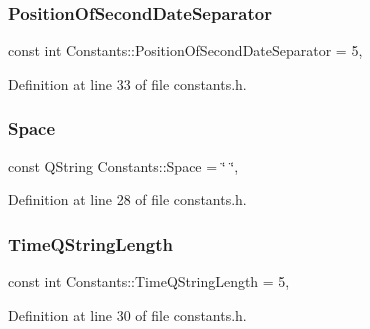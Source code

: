\hypertarget{classConstants_a6d9e83adc428b25381bc25b2e38843ea}{}\label{classConstants_a6d9e83adc428b25381bc25b2e38843ea} 
\subsubsection{\texorpdfstring{Position\+Of\+Second\+Date\+Separator}{PositionOfSecondDateSeparator}}
{\footnotesize\ttfamily const int Constants\+::\+Position\+Of\+Second\+Date\+Separator = 5\hspace{0.3cm}{\ttfamily [static]}, {\ttfamily [private]}}



Definition at line 33 of file constants.\+h.

\hypertarget{classConstants_ade4aef58a5c7280c4f0bd40ba7b30f3c}{}\label{classConstants_ade4aef58a5c7280c4f0bd40ba7b30f3c} 
\subsubsection{\texorpdfstring{Space}{Space}}
{\footnotesize\ttfamily const Q\+String Constants\+::\+Space = \char`\"{} \char`\"{}\hspace{0.3cm}{\ttfamily [static]}, {\ttfamily [private]}}



Definition at line 28 of file constants.\+h.

\hypertarget{classConstants_a577e140cbb46e0fe143af8c18c29cee1}{}\label{classConstants_a577e140cbb46e0fe143af8c18c29cee1} 
\subsubsection{\texorpdfstring{Time\+Q\+String\+Length}{TimeQStringLength}}
{\footnotesize\ttfamily const int Constants\+::\+Time\+Q\+String\+Length = 5\hspace{0.3cm}{\ttfamily [static]}, {\ttfamily [private]}}



Definition at line 30 of file constants.\+h.

\hypertarget{classConstants_aa6a4e4e111634badc8b8aeba9df024ce}{}\label{classConstants_aa6a4e4e111634badc8b8aeba9df024ce} 
